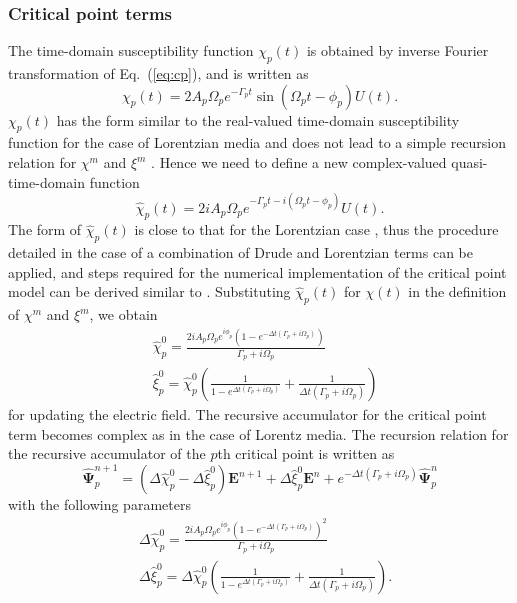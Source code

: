 \subsubsection{Critical point terms}
\label{sec:plrc_cp}
The time-domain susceptibility function $\chi_p(t)$ is obtained by inverse Fourier transformation of Eq.~(\ref{eq:cp}), and is written as
\begin{equation}
\chi_p(t) = 2 A_p \Omega_p e^{-\Gamma_p t} \sin(\Omega_p t- \phi_p) U(t).
\label{eq:cp_t}
\end{equation}
$\chi_p(t)$ has the form similar to the real-valued time-domain susceptibility function for the case of Lorentzian media and does not lead to a simple recursion relation for $\chi^m$ and $\xi^m$ \cite{kelley_piecewise_1996}. Hence we need to define a new complex-valued quasi-time-domain function \cite{vial_implementation_2007}
\begin{equation}
\hat{\chi}_p(t) = 2 i A_p \Omega_p e^{-\Gamma_p t - i (\Omega_p t - \phi_p)} U(t).
\end{equation}
The form of $\hat{\chi}_p(t)$ is close to that for the Lorentzian case \cite{kelley_piecewise_1996}, thus the procedure detailed in the case of a combination of Drude and Lorentzian terms can be applied, and steps required for the numerical implementation of the critical point model can be derived similar to \citet{vial_description_2007}. Substituting $\hat{\chi}_p(t)$ for $\chi(t)$ in the definition of $\chi^m$ and $\xi^m$, we obtain
\begin{equation}
\begin{split}
&\hat{\chi}_p^0 = \frac{2 i A_p \Omega_p e^{i \phi_p} (1 - e^{-\Delta t(\Gamma_p + i \Omega_p)})}{\Gamma_p + i \Omega_p}\\
&\hat{\xi}_p^0 = \hat{\chi}_p^0 \left ( \frac{1}{1 - e^{\Delta t (\Gamma_p + i \Omega_p)}} + \frac{1}{\Delta t (\Gamma_p + i \Omega_p)} \right )
\end{split}
\end{equation}
for updating the electric field. The recursive accumulator for the critical point term becomes complex as in the case of Lorentz media. The recursion relation for the recursive accumulator of the $p$th critical point is written as
\begin{equation}
\hat{\mathbf{\Psi}}_p^{n+1} = (\Delta \hat \chi_p^0 - \Delta \hat \xi_p^0) \mathbf{E}^{n+1} + \Delta \hat \xi_p^0 \mathbf{E}^n + e^{-\Delta t (\Gamma_p + i \Omega_p)} \hat{\mathbf{\Psi}}_p^n
\label{eq:rec_accu_cp}
\end{equation}
with the following parameters
\begin{equation}
\begin{split}
&\Delta \hat \chi_p^0 = \frac{2 i A_p \Omega_p e^{i \phi_p} (1 - e^{- \Delta t (\Gamma_p + i \Omega_p)})^2}{\Gamma_p + i \Omega_p}\\
&\Delta \hat \xi_p^0 = \Delta \hat \chi_p^0 \left ( \frac{1}{1 - e^{\Delta t (\Gamma_p + i \Omega_p)}} + \frac{1}{\Delta t (\Gamma_p + i \Omega_p)} \right ).
\end{split}
\end{equation}

